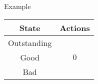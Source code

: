 \documentclass[usenames,dvipsnames,aspectratio=169,11pt, envcountsect, handout]{beamer}
\begin{document}
\begin{frame}{Example}
\begin{table}[H]
		\begin{minipage}{0.29\textwidth}
			\centering
			\begin{tabular}{c | c}
				State       & Actions                   \\
				\hline
				Outstanding & \multirow{3}{*}{ \( 0 \)} \\
				Good        &                           \\
				Bad         &                           \\
			\end{tabular}
			\vspace{0.5cm} %
		\end{minipage}
	\end{table}

\end{frame}
\end{document}
